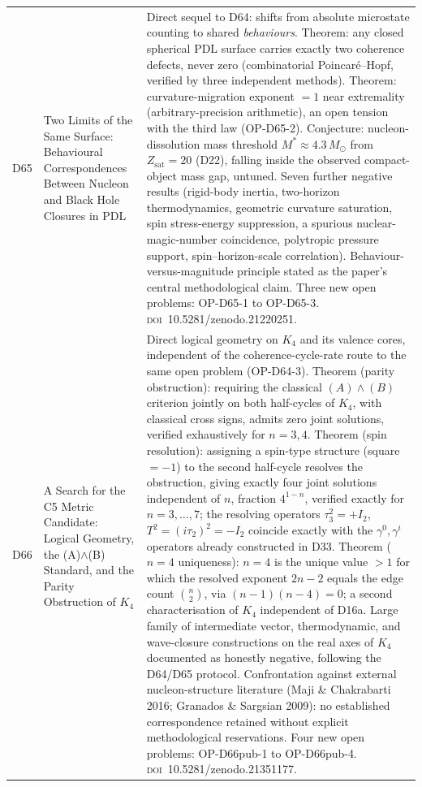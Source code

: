 \documentclass[11pt,a4paper]{article}
\theoremstyle{plain}
\theoremstyle{definition}
\theoremstyle{remark}
\newcommand{\Zsat}{Z_{\mathrm{sat}}}
\begin{document}
\begin{longtable}{L{1.3cm}L{3.8cm}L{8.0cm}}
D65 & Two Limits of the Same Surface: Behavioural Correspondences Between Nucleon and Black Hole Closures in PDL~\cite{D65} & Direct sequel to D64: shifts from absolute microstate counting to shared \emph{behaviours}. \textcolor{proofblue}{Theorem}: any closed spherical PDL surface carries exactly two coherence defects, never zero (combinatorial Poincar\'e--Hopf, verified by three independent methods). \textcolor{proofblue}{Theorem}: curvature-migration exponent $=1$ near extremality (arbitrary-precision arithmetic), an open tension with the third law (OP-D65-2). \textcolor{conjecturegreen}{Conjecture}: nucleon-dissolution mass threshold $M^*\approx4.3\,M_\odot$ from $\Zsat=20$ (D22), falling inside the observed compact-object mass gap, untuned. Seven further negative results (rigid-body inertia, two-horizon thermodynamics, geometric curvature saturation, spin stress-energy suppression, a spurious nuclear-magic-number coincidence, polytropic pressure support, spin--horizon-scale correlation). Behaviour-versus-magnitude principle stated as the paper's central methodological claim. Three new open problems: OP-D65-1 to OP-D65-3. \textsc{doi}~10.5281/zenodo.21220251.\\[0.4em]
D66 & A Search for the C5 Metric Candidate: Logical Geometry, the (A)$\wedge$(B) Standard, and the Parity Obstruction of $K_4$~\cite{D66} & Direct logical geometry on $K_4$ and its valence cores, independent of the coherence-cycle-rate route to the same open problem (OP-D64-3). \textcolor{proofblue}{Theorem} (parity obstruction): requiring the classical $(A)\wedge(B)$ criterion jointly on both half-cycles of $K_4$, with classical cross signs, admits zero joint solutions, verified exhaustively for $n=3,4$. \textcolor{proofblue}{Theorem} (spin resolution): assigning a spin-type structure (square $=-1$) to the second half-cycle resolves the obstruction, giving exactly four joint solutions independent of $n$, fraction $4^{1-n}$, verified exactly for $n=3,\ldots,7$; the resolving operators $\tau_3^2=+I_2$, $T^2=(i\tau_2)^2=-I_2$ coincide exactly with the $\gamma^0,\gamma^i$ operators already constructed in D33. \textcolor{proofblue}{Theorem} ($n=4$ uniqueness): $n=4$ is the unique value $>1$ for which the resolved exponent $2n-2$ equals the edge count $\binom{n}{2}$, via $(n-1)(n-4)=0$; a second characterisation of $K_4$ independent of D16a. Large family of intermediate vector, thermodynamic, and wave-closure constructions on the real axes of $K_4$ documented as honestly negative, following the D64/D65 protocol. Confrontation against external nucleon-structure literature (Maji \& Chakrabarti 2016; Granados \& Sargsian 2009): no established correspondence retained without explicit methodological reservations. Four new open problems: OP-D66pub-1 to OP-D66pub-4. \textsc{doi}~10.5281/zenodo.21351177.\\[0.4em]

\end{longtable}
\end{document}
